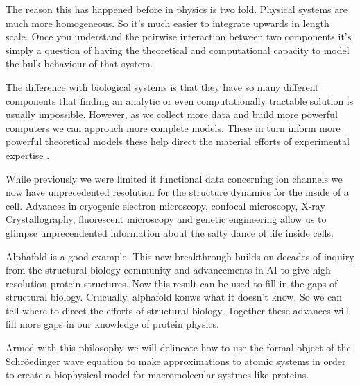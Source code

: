 The reason this has happened before in physics is two fold. Physical systems are much more homogeneous. So it's much easier to integrate upwards in length scale. Once you understand the pairwise interaction between two components it's simply a question of having the theoretical and computational capacity to model the bulk behaviour of that system. 

The difference with biological systems is that they have so many different components that finding an analytic or even computationally tractable solution is usually impossible. However, as we collect more data and build more powerful computers we can approach more complete models. These in turn inform more powerful theoretical models these help direct the material efforts of experimental expertise . 

While previously we were limited it functional data concerning ion channels we now have unprecedented resolution for the structure dynamics for the inside of a cell. Advances in cryogenic electron microscopy, confocal microscopy, X-ray Crystallography, fluorescent microscopy and genetic engineering allow us to glimpse unprecendented information about the salty dance of life inside cells.

Alphafold is a good example. This new breakthrough builds on decades of inquiry from the structural biology community and advancements in AI to give high resolution protein structures. Now this result can be used to fill in the gaps of structural biology. Crucually, alphafold konws what it doesn't know. So we can tell where to direct the efforts of structural biology. Together these advances will fill more gaps in our knowledge of protein physics. 

Armed with this philosophy we will delineate how to use the formal object of the Schr\"oedinger wave equation to make approximations to atomic systems in order to create a biophysical model for macromolecular systmes like proteins.
